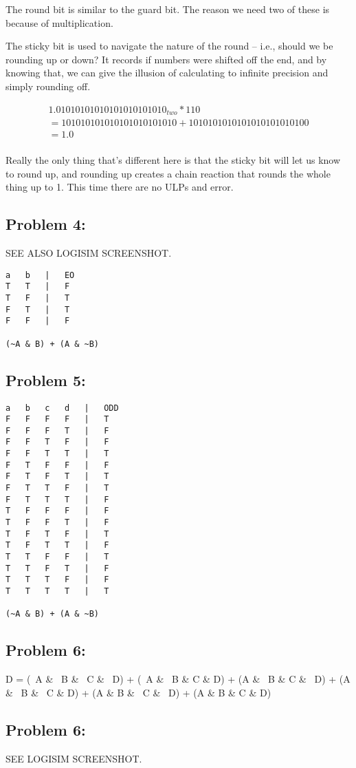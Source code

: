 \documentclass[a4paper]{article}
\begin{document}
The round bit is similar to the guard bit. The reason we need two of these is because of multiplication.

The sticky bit is used to navigate the nature of the round -- i.e., should we be rounding up or down? It records if numbers were shifted off the end, and by knowing that, we can give the illusion of calculating to infinite precision and simply rounding off.

\begin{align}
1.01010101010101010101010_{two} * 110 \\
= 101010101010101010101010 + 1010101010101010101010100 \\
= 1.0 \\
\end{align}

Really the only thing that's different here is that the sticky bit will let us know to round up, and rounding up creates a chain reaction that rounds the whole thing up to 1. This time there are no ULPs and error.

\subsection*{Problem 4:}
SEE ALSO LOGISIM SCREENSHOT.
\begin{verbatim}
a	b	|	EO
T	T	|	F
T	F	|	T
F	T	|	T
F	F	|	F

(~A & B) + (A & ~B)
\end{verbatim}

\subsection*{Problem 5:}
\begin{verbatim}
a	b	c	d	|	ODD
F	F	F	F	|	T
F	F	F	T	|	F
F	F	T	F	|	F
F	F	T	T	|	T
F	T	F	F	|	F
F	T	F	T	|	T
F	T	T	F	|	T
F	T	T	T	|	F
T	F	F	F	|	F
T	F	F	T	|	F
T	F	T	F	|	T
T	F	T	T	|	F
T	T	F	F	|	T
T	T	F	T	|	F
T	T	T	F	|	F
T	T	T	T	|	T

(~A & B) + (A & ~B)
\end{verbatim}

\subsection*{Problem 6:}
D = (~A \& ~B \& ~C \& ~D) + (~A \& ~B \& C \& D) + (A \& ~B \& C \& ~D) + (A \& ~B \& ~C \& D) + (A \& B \& ~C \& ~D) + (A \& B \& C \& D)

\subsection*{Problem 6:}
SEE LOGISIM SCREENSHOT.
\end{document}
